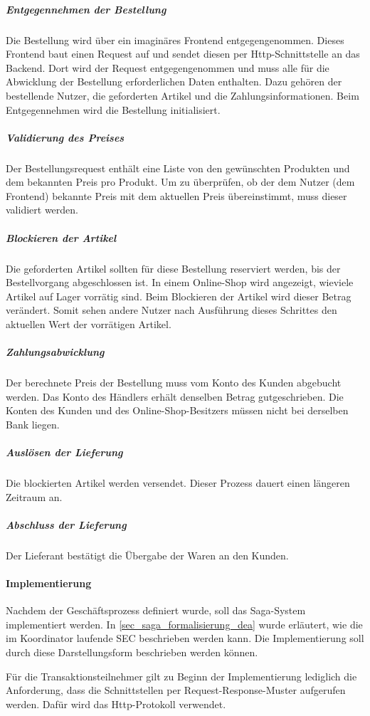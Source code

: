 \subparagraph*{Entgegennehmen der Bestellung} Die Bestellung wird über ein imaginäres Frontend entgegengenommen. Dieses Frontend baut einen Request auf und sendet diesen per Http-Schnittstelle an das Backend. Dort wird der Request entgegengenommen und muss alle für die Abwicklung der Bestellung erforderlichen Daten enthalten. Dazu gehören der bestellende Nutzer, die geforderten Artikel und die Zahlungsinformationen. Beim Entgegennehmen wird die Bestellung initialisiert.

\subparagraph*{Validierung des Preises} Der Bestellungsrequest enthält eine Liste von den gewünschten Produkten und dem bekannten Preis pro Produkt. Um zu überprüfen, ob der dem Nutzer (dem Frontend) bekannte Preis mit dem aktuellen Preis übereinstimmt, muss dieser validiert werden. %

\subparagraph*{Blockieren der Artikel} Die geforderten Artikel sollten für diese Bestellung reserviert werden, bis der Bestellvorgang abgeschlossen ist. In einem Online-Shop wird angezeigt, wieviele Artikel auf Lager vorrätig sind. Beim Blockieren der Artikel wird dieser Betrag verändert. Somit sehen andere Nutzer nach Ausführung dieses Schrittes den aktuellen Wert der vorrätigen Artikel. 

\subparagraph*{Zahlungsabwicklung} Der berechnete Preis der Bestellung muss vom Konto des Kunden abgebucht werden. Das Konto des Händlers erhält denselben Betrag gutgeschrieben. Die Konten des Kunden und des Online-Shop-Besitzers müssen nicht bei derselben Bank liegen. 

\subparagraph*{Auslösen der Lieferung} Die blockierten Artikel werden versendet. Dieser Prozess dauert einen längeren Zeitraum an.

\subparagraph*{Abschluss der Lieferung} Der Lieferant bestätigt die Übergabe der Waren an den Kunden.


\paragraph*{Implementierung}

Nachdem der Geschäftsprozess definiert wurde, soll das Saga-System implementiert werden. In \ref{sec_saga_formalisierung_dea} wurde erläutert, wie die im Koordinator laufende SEC beschrieben werden kann. Die Implementierung soll durch diese Darstellungsform beschrieben werden können.

Für die Transaktionsteilnehmer gilt zu Beginn der Implementierung lediglich die Anforderung, dass die Schnittstellen per Request-Response-Muster aufgerufen werden. Dafür wird das Http-Protokoll verwendet.

